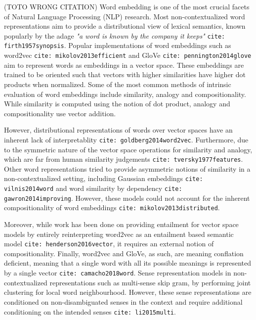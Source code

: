 \documentclass[11pt]{book}
\newcommand{\citep}[1]{\texttt{cite: #1}}
\begin{document}
(TOTO \cite{levy2012call} WRONG CITATION)
Word embedding is one of the most crucial facets of Natural Language Processing
(NLP) research. Most non-contextualized word representations aim to provide a
distributional view of lexical semantics, known popularly by the adage
\textit{"a word is known by the company it keeps"} \citep{firth1957synopsis}.
Popular implementations of word embeddings such as word2vec
\citep{mikolov2013efficient} and GloVe \citep{pennington2014glove} aim to
represent words as embeddings in a vector space. These embeddings are trained
to be oriented such that vectors with higher similarities have higher dot
products when normalized. Some of the most common methods of intrinsic
evaluation of word embeddings include similarity, analogy and compositionality.
While similarity is computed using the notion of dot product, analogy and
compositionality use vector addition.

However, distributional representations of words over vector spaces have an
inherent lack of interpretablity \citep{goldberg2014word2vec}. Furthermore, due
to the symmetric nature of the vector space operations for similarity and
analogy, which are far from human similarity judgements
\citep{tversky1977features}. Other word representations tried to provide
asymmetric notions of similarity in a non-contextualized setting, including
Gaussian embeddings \citep{vilnis2014word} and word similarity by dependency
\citep{gawron2014improving}. However, these models could not account for the
inherent compositionality of word embeddings \citep{mikolov2013distributed}. 

Moreover, while work has been done on providing entailment for vector space
models by entirely reinterpreting word2vec as an entailment based semantic
model \citep{henderson2016vector}, it requires an external notion of
compositionality. Finally, word2vec and GloVe, as such, are meaning conflation
deficient, meaning that a single word with all its possible meanings is
represented by a single vector \citep{camacho2018word}. Sense representation
models in non-contextualized representations such as multi-sense skip gram, by
performing joint clustering for local word neighbourhood. However, these sense
representations are conditioned on non-disambiguated senses in the context and
require additional conditioning on the intended senses \citep{li2015multi}. 
\end{document}
